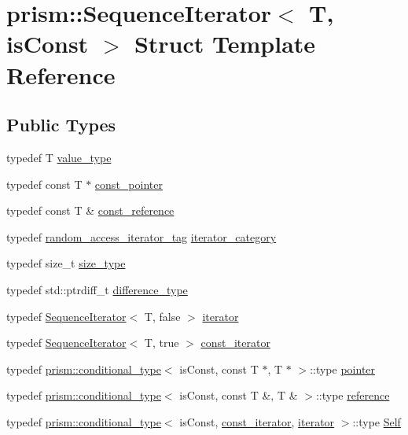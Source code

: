 \hypertarget{structprism_1_1_sequence_iterator}{}\section{prism\+:\+:Sequence\+Iterator$<$ T, is\+Const $>$ Struct Template Reference}
\label{structprism_1_1_sequence_iterator}
\subsection*{Public Types}
\begin{DoxyCompactItemize}
\item 
typedef T \hyperlink{structprism_1_1_sequence_iterator_a3b926a44e4184aecd9ab649cadab392d}{value\+\_\+type}
\item 
typedef const T $\ast$ \hyperlink{structprism_1_1_sequence_iterator_a4c3367cd1e3aacc1cd902bab256ee6b2}{const\+\_\+pointer}
\item 
typedef const T \& \hyperlink{structprism_1_1_sequence_iterator_a7739d968cd075878171e063d7a60d2e2}{const\+\_\+reference}
\item 
typedef \hyperlink{structprism_1_1random__access__iterator__tag}{random\+\_\+access\+\_\+iterator\+\_\+tag} \hyperlink{structprism_1_1_sequence_iterator_a8525d9ddbb07664ddab39df5d6d72b03}{iterator\+\_\+category}
\item 
typedef size\+\_\+t \hyperlink{structprism_1_1_sequence_iterator_a5a9c57ebdda1cd8eb2e4b3ddbd627fcf}{size\+\_\+type}
\item 
typedef std\+::ptrdiff\+\_\+t \hyperlink{structprism_1_1_sequence_iterator_a256c83c7b6da801b16778f39697e8db3}{difference\+\_\+type}
\item 
typedef \hyperlink{structprism_1_1_sequence_iterator}{Sequence\+Iterator}$<$ T, false $>$ \hyperlink{structprism_1_1_sequence_iterator_ac791d493ea5fafcc435a83dbe2385a1e}{iterator}
\item 
typedef \hyperlink{structprism_1_1_sequence_iterator}{Sequence\+Iterator}$<$ T, true $>$ \hyperlink{structprism_1_1_sequence_iterator_a8be80243dfbbc36132e108a7858eafd0}{const\+\_\+iterator}
\item 
typedef \hyperlink{structprism_1_1conditional__type}{prism\+::conditional\+\_\+type}$<$ is\+Const, const T $\ast$, T $\ast$ $>$\+::type \hyperlink{structprism_1_1_sequence_iterator_aba1344ee0e1c4be6658f8a3413c66df2}{pointer}
\item 
typedef \hyperlink{structprism_1_1conditional__type}{prism\+::conditional\+\_\+type}$<$ is\+Const, const T \&, T \& $>$\+::type \hyperlink{structprism_1_1_sequence_iterator_ac93bc1c2e901ea09aba9c3af33da21ba}{reference}
\item 
typedef \hyperlink{structprism_1_1conditional__type}{prism\+::conditional\+\_\+type}$<$ is\+Const, \hyperlink{structprism_1_1_sequence_iterator_a8be80243dfbbc36132e108a7858eafd0}{const\+\_\+iterator}, \hyperlink{structprism_1_1_sequence_iterator_ac791d493ea5fafcc435a83dbe2385a1e}{iterator} $>$\+::type \hyperlink{structprism_1_1_sequence_iterator_ab79c94ff5b3328808b659f19d6bc0301}{Self}
\end{DoxyCompactItemize}
